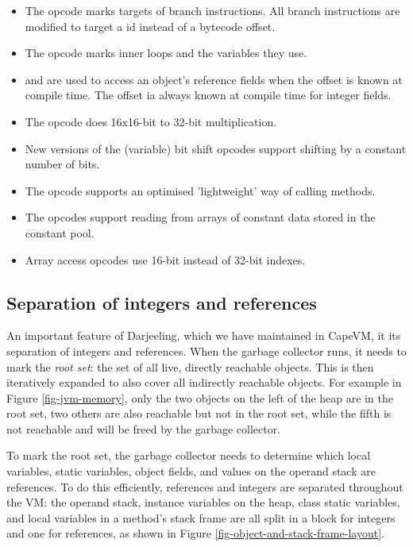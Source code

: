 \begin{itemize}
    \item The  opcode marks targets of branch instructions. All branch instructions are modified to target a  id instead of a bytecode offset.
    \item The  opcode marks inner loops and the variables they use.
    \item {} and  are used to access an object's reference fields when the offset is known at compile time. The offset ia always known at compile time for integer fields.
    \item The  opcode does 16x16-bit to 32-bit multiplication.
    \item New  versions of the (variable) bit shift opcodes support shifting by a constant number of bits.
    \item The  opcode supports an optimised 'lightweight' way of calling methods.
    \item The  opcodes support reading from arrays of constant data stored in the constant pool.
    \item Array access opcodes use 16-bit instead of 32-bit indexes.
\end{itemize}


\subsection{Separation of integers and references}
\label{sec-darjeeling-split-architecure}

An important feature of Darjeeling, which we have maintained in CapeVM, it its separation of integers and references. When the garbage collector runs, it needs to mark the \emph{root set}: the set of all live, directly reachable objects. This is then iteratively expanded to also cover all indirectly reachable objects. For example in Figure \ref{fig-jvm-memory}, only the two objects on the left of the heap are in the root set, two others are also reachable but not in the root set, while the fifth is not reachable and will be freed by the garbage collector.

To mark the root set, the garbage collector needs to determine which local variables, static variables, object fields, and values on the operand stack are references. To do this efficiently, references and integers are separated throughout the VM: the operand stack, instance variables on the heap, class static variables, and local variables in a method's stack frame are all split in a block for integers and one for references, as shown in Figure \ref{fig-object-and-stack-frame-layout}.

